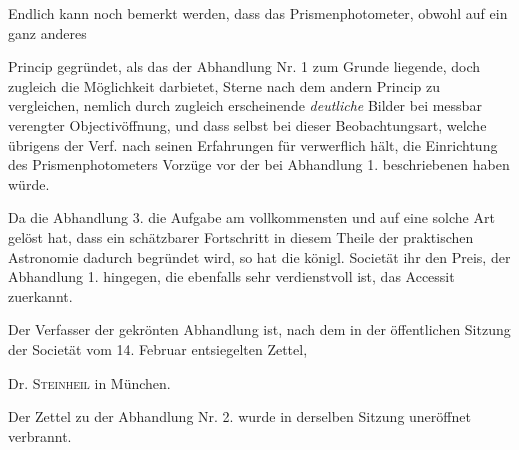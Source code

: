 Endlich kann noch bemerkt werden, dass das Prismenphotometer, obwohl auf ein ganz anderes\par
\clearpage
\thispagestyle{empty}
\noindent{}%
%
%
\makebox[12mm][r]{}\par\medskip
\noindent Princip gegründet, als das der Abhandlung Nr. 1 zum Grunde liegende, doch zugleich die
Möglichkeit darbietet, Sterne nach dem andern Princip zu vergleichen, nemlich durch zugleich
erscheinende \emph{deutliche} Bilder bei messbar verengter Objectivöffnung, und dass selbst bei
dieser Beobachtungsart, welche übrigens der Verf. nach seinen Erfahrungen für verwerflich hält,
die Einrichtung des Prismenphotometers Vorzüge vor der bei Abhandlung 1. beschriebenen haben
würde.

Da die Abhandlung 3. die Aufgabe am vollkommensten und auf eine solche Art gelöst hat, dass ein
schätzbarer Fortschritt in diesem Theile der praktischen Astronomie dadurch begründet wird, so hat
die königl. Societät ihr den Preis, der Abhandlung 1. hingegen, die ebenfalls sehr verdienstvoll
ist, das Accessit zuerkannt.

Der Verfasser der gekrönten Abhandlung ist, nach dem in der öffentlichen Sitzung der Societät vom
14. Februar entsiegelten Zettel,

\begin{center}
Dr. \textsc{Steinheil} in München.
\end{center}

Der Zettel zu der Abhandlung Nr. 2. wurde in derselben Sitzung uneröffnet verbrannt.

